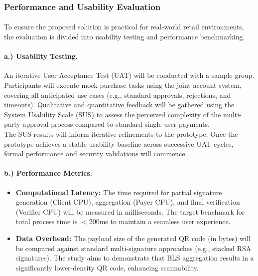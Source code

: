 \documentclass[a4paper]{scl-article}
\begin{document}
\subsubsection{Performance and Usability Evaluation}
\label{sect:meth4_c}
\paragraph{}To ensure the proposed solution is practical for real-world retail environments, the evaluation is divided into usability testing and performance benchmarking.

\paragraph{a.) Usability Testing.}
An iterative User Acceptance Test (UAT) will be conducted with a sample group. Participants will execute mock purchase tasks using the joint account system, covering all anticipated use cases (e.g., standard approvals, rejections, and timeouts). Qualitative and quantitative feedback will be gathered using the System Usability Scale (SUS) to assess the perceived complexity of the multi-party approval process compared to standard single-user payments. \\

The SUS results will inform iterative refinements to the prototype. Once the prototype achieves a stable usability baseline across successive UAT cycles, formal performance and security validations will commence.

\paragraph{b.) Performance Metrics.}
\begin{itemize}
    \item \textbf{Computational Latency:} The time required for partial signature generation (Client CPU), aggregation (Payer CPU), and final verification (Verifier CPU) will be measured in milliseconds. The target benchmark for total process time is $<200$ms to maintain a seamless user experience.
    \item \textbf{Data Overhead:} The payload size of the generated QR code (in bytes) will be compared against standard multi-signature approaches (e.g., stacked RSA signatures). The study aims to demonstrate that BLS aggregation results in a significantly lower-density QR code, enhancing scannability.
\end{itemize}
\end{document}
